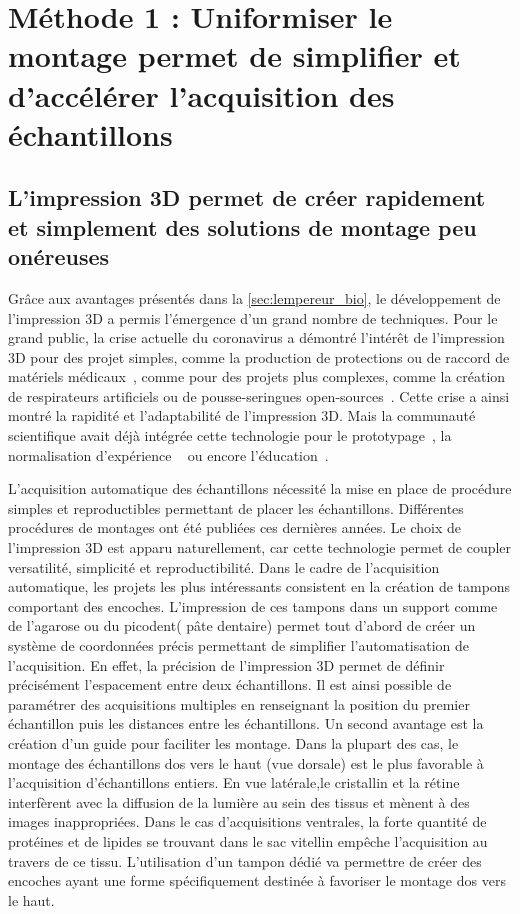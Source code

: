 \documentclass[\main/main.tex]{subfiles}
\begin{document}
\chapter{
    \label{sec:montage}
    Méthode 1 : Uniformiser le montage permet de simplifier et d'accélérer l'acquisition des échantillons
    }


    \section{L'impression 3D permet de créer rapidement et simplement des solutions de montage peu onéreuses}
    
%
Grâce aux avantages présentés dans la \autoref{sec:lempereur_bio}, le développement de l'impression 3D a permis l'émergence d'un grand nombre de techniques.
%
Pour le grand public, la crise actuelle du coronavirus a démontré l'intérêt de l'impression 3D
pour des projet simples, comme la production de protections ou de raccord de matériels médicaux~\cite{callahan_2020,ishack_2020,wesemann_2020}, comme pour des projets plus complexes, comme la création de respirateurs artificiels ou de pousse-seringues open-sources~\cite{na_website_nda}.
%
Cette crise a ainsi montré la rapidité et l'adaptabilité de l'impression 3D.
%
Mais la communauté scientifique avait déjà intégrée cette technologie pour le prototypage~\cite{he_2016}, la normalisation d'expérience ~\cite{pinskiy_2013} ou encore l'éducation~\cite{maiachagas_2017}.
    
%
L'acquisition automatique des échantillons nécessité la mise en place de procédure simples
et reproductibles permettant de placer les échantillons.
%
Différentes procédures de montages ont été publiées ces dernières années.
%
Le choix de l'impression 3D est apparu naturellement, car cette technologie permet de coupler versatilité, simplicité et reproductibilité.
%
Dans le cadre de l'acquisition automatique, les projets les plus intéressants consistent en la création de tampons comportant des encoches.
%
L'impression de ces tampons dans un support comme de l'agarose ou du picodent( pâte dentaire) permet tout d'abord de créer un système de coordonnées précis
permettant de simplifier l'automatisation de l'acquisition. En effet, la précision de l'impression 3D permet de définir précisément l'espacement entre deux échantillons.
Il est ainsi possible de paramétrer des acquisitions multiples en renseignant la position du premier échantillon puis les distances entre les échantillons.
%
Un second avantage est la création d'un guide pour faciliter les montage. Dans la plupart des cas, le montage des échantillons dos vers le haut (vue dorsale)
est le plus favorable à l'acquisition d'échantillons entiers. En vue latérale,le cristallin et la rétine interfèrent avec la diffusion de la lumière au sein des tissus et mènent à des images inappropriées.
Dans le cas d'acquisitions ventrales, la forte quantité de protéines et de lipides se trouvant dans le sac vitellin empêche l'acquisition au travers de ce tissu.
%
L'utilisation d'un tampon dédié va permettre de créer des encoches ayant une forme spécifiquement destinée à favoriser le montage dos vers le haut.
\end{document}
